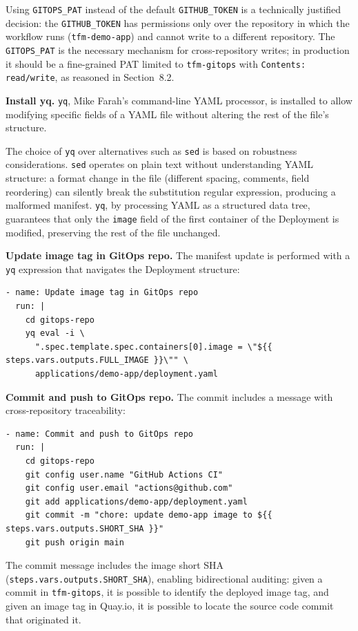 Using \texttt{GITOPS\_PAT} instead of the default \texttt{GITHUB\_TOKEN} is a technically justified decision: the \texttt{GITHUB\_TOKEN} has permissions only over the repository in which the workflow runs (\texttt{tfm-demo-app}) and cannot write to a different repository. The \texttt{GITOPS\_PAT} is the necessary mechanism for cross-repository writes; in production it should be a fine-grained PAT limited to \texttt{tfm-gitops} with \texttt{Contents: read/write}, as reasoned in Section~8.2.

\textbf{Install yq.} \texttt{yq}, Mike Farah's command-line YAML processor, is installed to allow modifying specific fields of a YAML file without altering the rest of the file's structure.

The choice of \texttt{yq} over alternatives such as \texttt{sed} is based on robustness considerations. \texttt{sed} operates on plain text without understanding YAML structure: a format change in the file (different spacing, comments, field reordering) can silently break the substitution regular expression, producing a malformed manifest. \texttt{yq}, by processing YAML as a structured data tree, guarantees that only the \texttt{image} field of the first container of the Deployment is modified, preserving the rest of the file unchanged.

\textbf{Update image tag in GitOps repo.} The manifest update is performed with a \texttt{yq} expression that navigates the Deployment structure:

\begin{lstlisting}
- name: Update image tag in GitOps repo
  run: |
    cd gitops-repo
    yq eval -i \
      ".spec.template.spec.containers[0].image = \"${{ steps.vars.outputs.FULL_IMAGE }}\"" \
      applications/demo-app/deployment.yaml
\end{lstlisting}

\textbf{Commit and push to GitOps repo.} The commit includes a message with cross-repository traceability:

\begin{lstlisting}
- name: Commit and push to GitOps repo
  run: |
    cd gitops-repo
    git config user.name "GitHub Actions CI"
    git config user.email "actions@github.com"
    git add applications/demo-app/deployment.yaml
    git commit -m "chore: update demo-app image to ${{ steps.vars.outputs.SHORT_SHA }}"
    git push origin main
\end{lstlisting}

The commit message includes the image short SHA (\texttt{steps.vars.outputs.SHORT\_SHA}), enabling bidirectional auditing: given a commit in \texttt{tfm-gitops}, it is possible to identify the deployed image tag, and given an image tag in Quay.io, it is possible to locate the source code commit that originated it.

